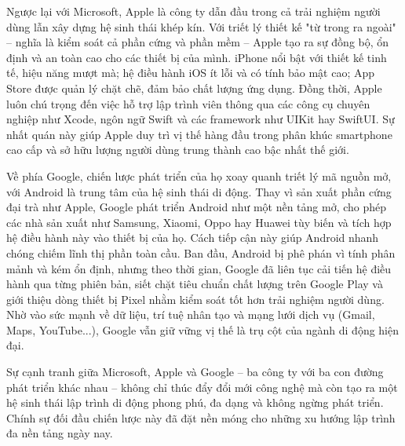     \begin{flushleft}
      \hspace*{0.8cm}Ngược lại với Microsoft, Apple là công ty dẫn đầu trong cả trải nghiệm người dùng lẫn xây dựng hệ sinh thái khép kín. Với triết lý thiết kế "từ trong ra ngoài" – nghĩa là kiểm soát cả phần cứng và phần mềm – Apple tạo ra sự đồng bộ, ổn định và an toàn cao cho các thiết bị của mình. iPhone nổi bật với thiết kế tinh tế, hiệu năng mượt mà; hệ điều hành iOS ít lỗi và có tính bảo mật cao; App Store được quản lý chặt chẽ, đảm bảo chất lượng ứng dụng. Đồng thời, Apple luôn chú trọng đến việc hỗ trợ lập trình viên thông qua các công cụ chuyên nghiệp như Xcode, ngôn ngữ Swift và các framework như UIKit hay SwiftUI. Sự nhất quán này giúp Apple duy trì vị thế hàng đầu trong phân khúc smartphone cao cấp và sở hữu lượng người dùng trung thành cao bậc nhất thế giới.
    \end{flushleft}

    \begin{flushleft}
      \hspace*{0.8cm}Về phía Google, chiến lược phát triển của họ xoay quanh triết lý mã nguồn mở, với Android là trung tâm của hệ sinh thái di động. Thay vì sản xuất phần cứng đại trà như Apple, Google phát triển Android như một nền tảng mở, cho phép các nhà sản xuất như Samsung, Xiaomi, Oppo hay Huawei tùy biến và tích hợp hệ điều hành này vào thiết bị của họ. Cách tiếp cận này giúp Android nhanh chóng chiếm lĩnh thị phần toàn cầu. Ban đầu, Android bị phê phán vì tính phân mảnh và kém ổn định, nhưng theo thời gian, Google đã liên tục cải tiến hệ điều hành qua từng phiên bản, siết chặt tiêu chuẩn chất lượng trên Google Play và giới thiệu dòng thiết bị Pixel nhằm kiểm soát tốt hơn trải nghiệm người dùng. Nhờ vào sức mạnh về dữ liệu, trí tuệ nhân tạo và mạng lưới dịch vụ (Gmail, Maps, YouTube...), Google vẫn giữ vững vị thế là trụ cột của ngành di động hiện đại.
    \end{flushleft}

    \begin{flushleft}
      \hspace*{0.8cm}Sự cạnh tranh giữa Microsoft, Apple và Google – ba công ty với ba con đường phát triển khác nhau – không chỉ thúc đẩy đổi mới công nghệ mà còn tạo ra một hệ sinh thái lập trình di động phong phú, đa dạng và không ngừng phát triển. Chính sự đối đầu chiến lược này đã đặt nền móng cho những xu hướng lập trình đa nền tảng ngày nay.
    \end{flushleft}

